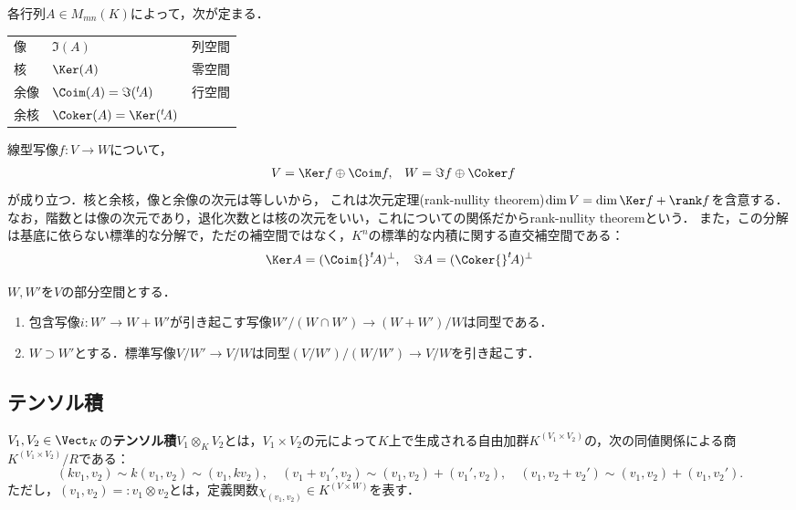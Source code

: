 \documentclass[uplatex, dvipdfmx]{jsreport}
\begin{document}
\begin{remarks}
    各行列$A\in M_{mn}(K)$によって，次が定まる．

    \begin{center}
        \begin{tabular}{l|l|l}
            像&$\Im(A)$&列空間\\
            核&$\Ker(A)$&零空間\\
            余像&$\Coim(A)=\Im({}^t\!A)$&行空間\\
            余核&$\Coker(A)=\Ker({}^t\!A)$&
        \end{tabular}
    \end{center}
    
    線型写像$f:V\to W$について，
    \begin{align*}
        V&=\Ker f\oplus\Coim f,&W&=\Im f\oplus\Coker f
    \end{align*}
    が成り立つ．核と余核，像と余像の次元は等しいから，
    これは次元定理(rank-nullity theorem)$\dim V=\dim\Ker f+\rank f$を含意する．
    なお，階数とは像の次元であり，退化次数とは核の次元をいい，これについての関係だからrank-nullity theoremという．
    また，この分解は基底に依らない標準的な分解で，ただの補空間ではなく，$K^n$の標準的な内積に関する直交補空間である：
    \begin{align*}
        \Ker A=(\Coim {}^t\!A)^\bot,\quad\Im A=(\Coker {}^t\!A)^\bot
    \end{align*}
\end{remarks}


\begin{corollary}[第二・第三同型定理]
    $W,W'$を$V$の部分空間とする．
    \begin{enumerate}
        \item 包含写像$i:W'\to W+W'$が引き起こす写像$W'/(W\cap W')\to(W+W')/W$は同型である．
        \item $W\supset W'$とする．標準写像$V/W'\to V/W$は同型$(V/W')/(W/W')\to V/W$を引き起こす．
    \end{enumerate}
\end{corollary}

\subsection{テンソル積}

\begin{definition}
    $V_1,V_2\in\Vect_K$の\textbf{テンソル積}$V_1\otimes_KV_2$とは，$V_1\times V_2$の元によって$K$上で生成される自由加群$K^{(V_1\times V_2)}$の，次の同値関係による商$K^{(V_1\times V_2)}/R$である：
    \[(kv_1,v_2)\sim k(v_1,v_2)\sim(v_1,kv_2),\quad(v_1+v_1',v_2)\sim(v_1,v_2)+(v_1',v_2),\quad(v_1,v_2+v_2')\sim(v_1,v_2)+(v_1,v_2').\]
    ただし，$(v_1,v_2)=:v_1\otimes v_2$とは，定義関数$\chi_{(v_1,v_2)}\in K^{(V\times W)}$を表す．
\end{definition}
\end{document}
